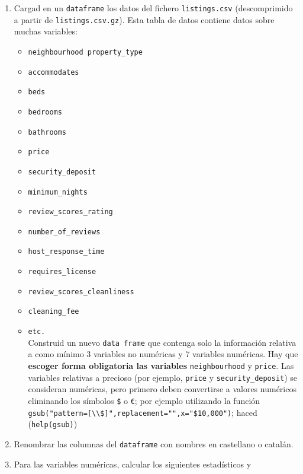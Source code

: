 \documentclass[
]{article}
\providecommand{\tightlist}{%
  \setlength{\itemsep}{0pt}\setlength{\parskip}{0pt}}
\begin{document}
\begin{enumerate}
\def\labelenumi{\arabic{enumi}.}
\item
  Cargad en un \texttt{dataframe} los datos del fichero
  \texttt{listings.csv} (descomprimido a partir de
  \texttt{listings.csv.gz}). Esta tabla de datos contiene datos sobre
  muchas variables:

  \begin{itemize}
  \tightlist
  \item
    \texttt{neighbourhood\ property\_type}
  \item
    \texttt{accommodates}
  \item
    \texttt{beds}
  \item
    \texttt{bedrooms}
  \item
    \texttt{bathrooms}
  \item
    \texttt{price}
  \item
    \texttt{security\_deposit}
  \item
    \texttt{minimum\_nights}
  \item
    \texttt{review\_scores\_rating}
  \item
    \texttt{number\_of\_reviews}
  \item
    \texttt{host\_response\_time}
  \item
    \texttt{requires\_license}
  \item
    \texttt{review\_scores\_cleanliness}
  \item
    \texttt{cleaning\_fee}
  \item
    \texttt{etc.}~\\
    Construid un nuevo \texttt{data\ frame} que contenga solo la
    información relativa a como mínimo 3 variables no numéricas y 7
    variables numéricas. Hay que \textbf{escoger forma obligatoria las
    variables} \texttt{neighbourhood} y \texttt{price}. Las variables
    relativas a precioso (por ejemplo, \texttt{price} y
    \texttt{security\_deposit}) se consideran numéricas, pero primero
    deben convertirse a valores numéricos eliminando los símbolos
    \texttt{\$} o \texttt{€}; por ejemplo utilizando la función
    \texttt{gsub("pattern={[}\textbackslash{}\textbackslash{}\${]}",replacement="",x="\$10,000")};
    haced (\texttt{help(gsub)})
  \end{itemize}
\item
  Renombrar las columnas del \texttt{dataframe} con nombres en
  castellano o catalán.
\item
  Para las variables numéricas, calcular los siguientes estadísticos y

\end{enumerate}
\end{document}
